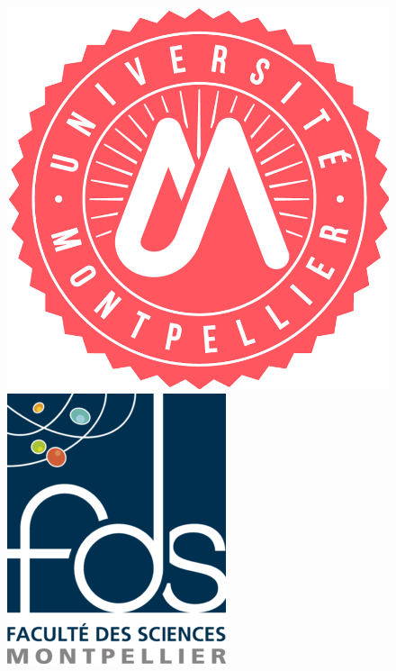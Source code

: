 \documentclass[a4paper,12pt]{report}   %
\begin{document}
\begin{titlepage}
    
    \begin{figure}[b!]
          \includegraphics[scale=0.153]{logo_um.png}
          \hfill
          \includegraphics[scale=1.18]{logo_fds.png}
    \end{figure}
  \end{titlepage}
\makeatother

\def\chaptername{Partie}
\renewcommand{\contentsname}{Sommaire}
\tableofcontents
\thispagestyle{empty}

\newpage
\end{document}
